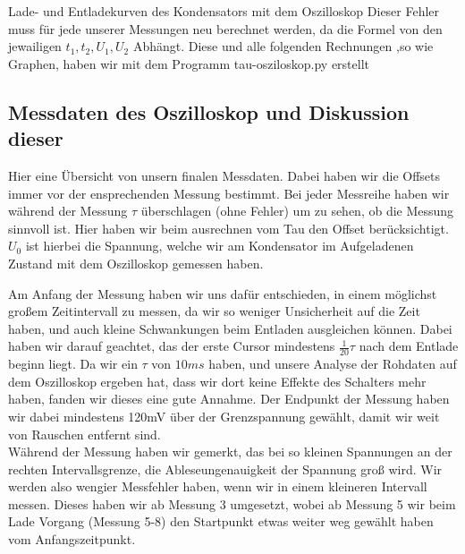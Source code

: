 \documentclass[twoside]{protokoll}
\begin{document}
\begin{aufgabe}{Lade- und Entladekurven des Kondensators mit dem Oszilloskop}
Dieser Fehler muss für jede unserer Messungen neu berechnet werden, da die Formel von den jewailigen $t_1, t_2, U_1, U_2$ Abhängt. 
Diese und alle folgenden Rechnungen ,so wie Graphen, haben wir mit dem Programm tau-osziloskop.py erstellt

\subsection{Messdaten des Oszilloskop und Diskussion dieser}
Hier eine Übersicht von unsern finalen Messdaten. Dabei haben wir die Offsets immer vor der ensprechenden Messung bestimmt.
Bei jeder Messreihe haben wir während der Messung $\tau$ überschlagen (ohne Fehler) um zu sehen, ob die Messung sinnvoll ist.
Hier haben wir beim ausrechnen vom Tau den Offset berücksichtigt.
$U_0$ ist hierbei die Spannung, welche wir am Kondensator im Aufgeladenen Zustand mit dem Oszilloskop gemessen haben.

Am Anfang der Messung haben wir uns dafür entschieden, in einem möglichst großem Zeitintervall zu messen, da wir so weniger Unsicherheit auf die Zeit haben, und auch kleine Schwankungen beim Entladen ausgleichen können.
Dabei haben wir darauf geachtet, das der erste Cursor mindestens $ \frac{1}{20} \tau $ nach dem Entlade beginn liegt.
Da wir ein $\tau$ von $10ms$ haben, und unsere Analyse der Rohdaten auf dem Oszilloskop ergeben hat, dass wir dort keine Effekte des Schalters mehr haben, fanden wir dieses eine gute Annahme.
Der Endpunkt der Messung haben wir dabei mindestens 120mV über der Grenzspannung gewählt, damit wir weit von Rauschen entfernt sind.\\
Während der Messung haben wir gemerkt, das bei so kleinen Spannungen an der rechten Intervallsgrenze, die Ableseungenauigkeit der Spannung groß wird.
Wir werden also wengier Messfehler haben, wenn wir in einem kleineren Intervall messen.
Dieses haben wir ab Messung 3 umgesetzt, wobei ab Messung 5 wir beim Lade Vorgang (Messung 5-8) den Startpunkt etwas weiter weg gewählt haben vom Anfangszeitpunkt.


\end{aufgabe}
\end{document}
